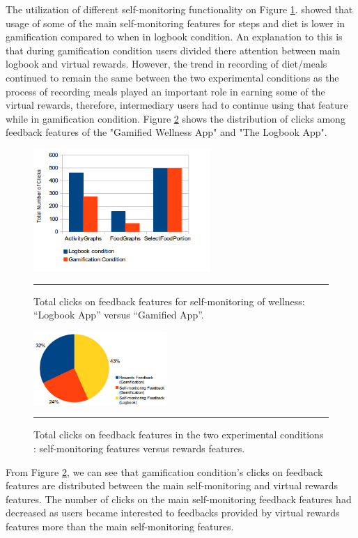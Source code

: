 The utilization of different self-monitoring functionality on Figure \ref{figure:self_monitoring_usage}. showed that usage of some of the main self-monitoring features for steps and diet is lower in gamification compared to when in logbook condition. An explanation to this is that during  gamification condition users divided there attention between main logbook and virtual rewards. However, the trend in recording of diet/meals continued to remain the same between the two experimental conditions as the process of recording meals played an important role in earning some of the virtual rewards, therefore, intermediary users had to continue using that feature while in gamification condition. Figure \ref{figure:clicks_distr} shows the distribution of clicks among feedback features of the "Gamified Wellness App" and "The Logbook App".
\begin{figure}[htbp]
  \centering
    \includegraphics[width=0.6\textwidth]{Figures/self_monitoring_usage.png}
    \rule{35em}{0.5pt}
  \caption{Total clicks on feedback features for self-monitoring of wellness: ``Logbook App'' versus ``Gamified App''.}
  \label{figure:self_monitoring_usage}
\end{figure}
\begin{figure}[htbp]
  \centering
    \includegraphics[width=0.45\textwidth]{Figures/clicks_distr.png}
    \rule{35em}{0.5pt}
  \caption{Total clicks on feedback features in the two experimental conditions : self-monitoring features versus rewards features.}
  \label{figure:clicks_distr}
\end{figure}
From Figure \ref{figure:clicks_distr}, we can see that gamification condition's clicks on feedback features are distributed between the main self-monitoring and virtual rewards features. The number of clicks on the main self-monitoring feedback features had decreased as users became interested to feedbacks provided by virtual rewards features more than the main self-monitoring features.

